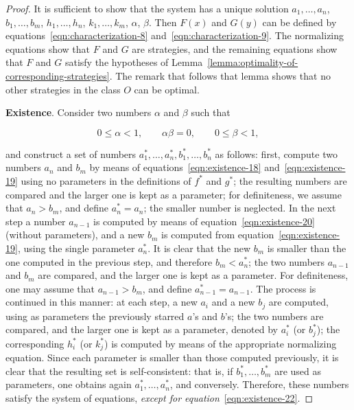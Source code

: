 \documentclass{article}
\theoremstyle{remark}
\begin{document}
\begin{proof}

It is sufficient to show that the system has a unique solution $a_1, \dots,
a_n$, $b_1, \dots, b_m$, $h_1, \dots, h_n$, $k_1, \dots, k_m$, $\alpha$,
$\beta$. Then $F(x)$ and $G(y)$ can be defined by
equations~\ref{eqn:characterization-8} and~\ref{eqn:characterization-9}. The
normalizing equations show that $F$ and $G$ are strategies, and the remaining
equations show that $F$ and $G$ satisfy the hypotheses of
Lemma~\ref{lemma:optimality-of-corresponding-strategies}. The remark that
follows that lemma shows that no other strategies in the class $O$ can be
optimal.

\textbf{Existence}. Consider two numbers $\alpha$ and $\beta$ such that

\[
0 \leq \alpha < 1, \qquad \alpha \beta = 0, \qquad 0 \leq \beta < 1,
\]

and construct a set of numbers $a_1^*, \dots, a_n^*, b_1^*, \dots, b_n^*$ as
follows: first, compute two numbers $a_n$ and $b_m$ by means of
equations~\ref{eqn:existence-18} and~\ref{eqn:existence-19} using no parameters
in the definitions of $f^*$ and $g^*$; the resulting numbers are compared and
the larger one is kept as a parameter; for definiteness, we assume that $a_n >
b_m$, and define $a_n^* = a_n$; the smaller number is neglected. In the next
step a number $a_{n-1}$ is computed by means of equation~\ref{eqn:existence-20}
(without parameters), and a new $b_m$ is computed from
equation~\ref{eqn:existence-19}, using the single parameter $a_n^*$. It is
clear that the new $b_m$ is smaller than the one computed in the previous step,
and therefore $b_m < a_n^*$; the two numbers $a_{n-1}$ and $b_m$ are compared,
and the larger one is kept as a parameter. For definiteness, one may assume
that $a_{n-1} > b_m$, and define $a_{n-1}^* = a_{n-1}$. The process is
continued in this manner: at each step, a new $a_i$ and a new $b_j$ are
computed, using as parameters the previously starred $a$'s and $b$'s; the two
numbers are compared, and the larger one is kept as a parameter, denoted by
$a_i^*$ (or $b_j^*$); the corresponding $h_i^*$ (or $k_j^*$) is computed by
means of the appropriate normalizing equation. Since each parameter is smaller
than those computed previously, it is clear that the resulting set is
self-consistent: that is, if $b_1^*, \dots, b_m^*$ are used as parameters, one
obtains again $a_1^*, \dots, a_n^*$, and conversely. Therefore, these numbers
satisfy the system of equations, \emph{except for
equation}~\ref{eqn:existence-22}.


\end{proof}
\end{document}
